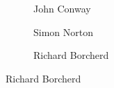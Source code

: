 \begin{frame}[plain]
\begin{figure}[h]
\begin{subfigure}{0.20\textwidth}
	\caption{\tiny \hspace{0.2cm}John Conway}
	\end{subfigure}
	\begin{subfigure}{0.20\textwidth}
	\captionsetup{labelformat=empty}
	\centering
	\caption{\tiny \hspace{0.2cm}Simon Norton}
	\end{subfigure} \quad
	\begin{subfigure}{0.20\textwidth}
	\captionsetup{labelformat=empty}
	\centering
	\caption{\tiny Richard Borcherd}
	\end{subfigure}
	\end{figure}


\end{frame}
